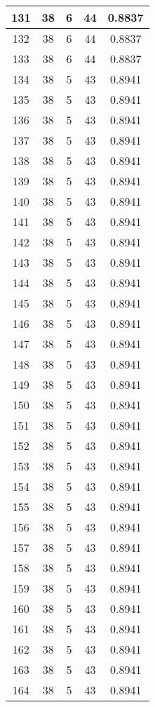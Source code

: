 \documentclass[letterpaper, 12pt]{article}
\begin{document}
\begin{longtable}{|c|c|c|c|c|}
\hline
131 & 38 & 6 & 44 & 0.8837 \\
\hline
132 & 38 & 6 & 44 & 0.8837 \\
\hline
133 & 38 & 6 & 44 & 0.8837 \\
\hline
134 & 38 & 5 & 43 & 0.8941 \\
\hline
135 & 38 & 5 & 43 & 0.8941 \\
\hline
136 & 38 & 5 & 43 & 0.8941 \\
\hline
137 & 38 & 5 & 43 & 0.8941 \\
\hline
138 & 38 & 5 & 43 & 0.8941 \\
\hline
139 & 38 & 5 & 43 & 0.8941 \\
\hline
140 & 38 & 5 & 43 & 0.8941 \\
\hline
141 & 38 & 5 & 43 & 0.8941 \\
\hline
142 & 38 & 5 & 43 & 0.8941 \\
\hline
143 & 38 & 5 & 43 & 0.8941 \\
\hline
144 & 38 & 5 & 43 & 0.8941 \\
\hline
145 & 38 & 5 & 43 & 0.8941 \\
\hline
146 & 38 & 5 & 43 & 0.8941 \\
\hline
147 & 38 & 5 & 43 & 0.8941 \\
\hline
148 & 38 & 5 & 43 & 0.8941 \\
\hline
149 & 38 & 5 & 43 & 0.8941 \\
\hline
150 & 38 & 5 & 43 & 0.8941 \\
\hline
151 & 38 & 5 & 43 & 0.8941 \\
\hline
152 & 38 & 5 & 43 & 0.8941 \\
\hline
153 & 38 & 5 & 43 & 0.8941 \\
\hline
154 & 38 & 5 & 43 & 0.8941 \\
\hline
155 & 38 & 5 & 43 & 0.8941 \\
\hline
156 & 38 & 5 & 43 & 0.8941 \\
\hline
157 & 38 & 5 & 43 & 0.8941 \\
\hline
158 & 38 & 5 & 43 & 0.8941 \\
\hline
159 & 38 & 5 & 43 & 0.8941 \\
\hline
160 & 38 & 5 & 43 & 0.8941 \\
\hline
161 & 38 & 5 & 43 & 0.8941 \\
\hline
162 & 38 & 5 & 43 & 0.8941 \\
\hline
163 & 38 & 5 & 43 & 0.8941 \\
\hline
164 & 38 & 5 & 43 & 0.8941 \\

\end{longtable}
\end{document}
